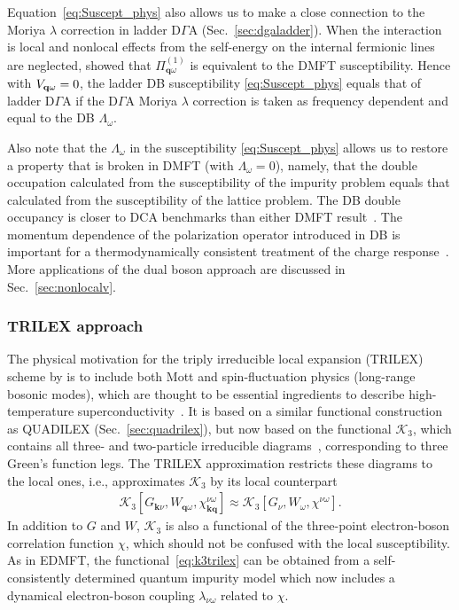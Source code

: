 \documentclass[rmp,aps,reprint,amsmath,amssymb,superscriptaddress,showpacs,nofootinbib]{revtex4-1}
\begin{document}
Equation~\eqref{eq:Suscept_phys} also allows us to make a close connection to the Moriya $\lambda$ correction in ladder D$\Gamma$A (Sec.~\ref{sec:dgaladder}). When the interaction is local and nonlocal effects from the self-energy on the internal fermionic lines are neglected,  showed that $\Pi _{\mathbf{q}\omega }^{(1)}$ is equivalent to the DMFT  susceptibility. Hence with $V_{{\bf q}\omega}=0$, the ladder DB susceptibility \eqref{eq:Suscept_phys} equals that of ladder D$\Gamma$A if the  D$\Gamma$A Moriya $\lambda$ correction is taken as frequency dependent and equal to the DB $\Lambda_{\omega}$.

Also note that the $\Lambda_\omega$ in the susceptibility \eqref{eq:Suscept_phys} allows us to restore a property that is broken in DMFT (with $\Lambda_\omega=0$), namely, that the double occupation calculated from the susceptibility of the impurity problem equals that calculated from the susceptibility of the lattice problem. The DB double occupancy is closer to DCA benchmarks than either DMFT result~\cite{vanLoon2016}. The momentum dependence of the polarization operator introduced in DB is important for a thermodynamically consistent treatment of the charge response~\cite{vanLoon2015}. More applications of the dual boson approach are discussed in Sec.~\ref{sec:nonlocalv}.

\subsubsection{TRILEX approach}
\label{sec:TRILEX}

The physical motivation for the triply irreducible local expansion (TRILEX) scheme by  is to include both Mott and spin-fluctuation physics (long-range bosonic modes), which are thought to be essential ingredients to describe high-temperature superconductivity~\cite{Dagotto94}. It is based on a similar functional construction as QUADILEX (Sec.~\ref{sec:quadrilex}), but now based on the functional $\mathcal{K}_{3}$, which contains all three- and two-particle  irreducible diagrams~\cite{DeDominicis1964}, corresponding to three Green's function legs. The TRILEX approximation restricts these diagrams to the local ones, i.e., approximates  $\mathcal{K}_{3}$  by its local counterpart \cite{Ayral2016}
\begin{align}
\label{eq:k3trilex}
  \mathcal{K}_{3}[G_{{\mathbf k}\nu},W_{{\mathbf q}\omega},\chi_{{\mathbf k}{\mathbf q}}^{\nu\omega}] \approx \mathcal{K}_{3}[G_\nu,W_{\omega},\chi^{\nu\omega}].
\end{align}
In addition to $G$ and $W$, $\mathcal{K}_{3}$ is also a functional of the three-point electron-boson correlation function $\chi$, which should not be confused with the local susceptibility.  As in EDMFT, the functional~\eqref{eq:k3trilex} can be obtained from a self-consistently determined quantum impurity model which now includes a dynamical electron-boson coupling $\lambda_{\nu\omega}$  related to  $\chi$.
\end{document}
